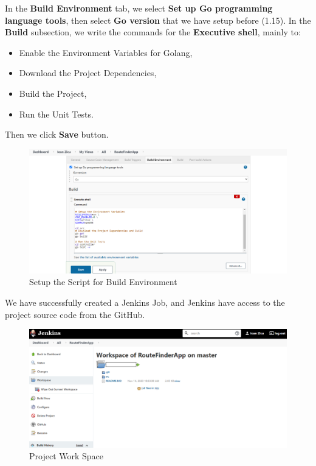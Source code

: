 \documentclass[12pt,a4paper,twoside]{article}
\begin{document}
In the \textbf{Build Environment} tab, we select \textbf{Set up Go programming language tools}, then select \textbf{Go version} that we have setup before (1.15).
In the \textbf{Build} subsection, we write the commands for the \textbf{Executive shell}, mainly to:


\begin{itemize}
	\item Enable the Environment Variables for Golang, 
	\item Download the Project Dependencies,
	\item Build the Project,
	\item Run the Unit Tests.
\end{itemize}


Then we click \textbf{Save} button.


\begin{figure}[H]
    \centering
        \includegraphics[width=15cm]{images-aws/36-project-build-env-golang-.png}
        \caption{Setup the Script for Build Environment}
\end{figure}


We have successfully created a Jenkins Job, and Jenkins have access to the project source code from the GitHub.


\begin{figure}[H]
    \centering
        \includegraphics[width=15cm]{images-aws/37-project-workspace-git.png}
        \caption{Project Work Space}
\end{figure}
\end{document}
